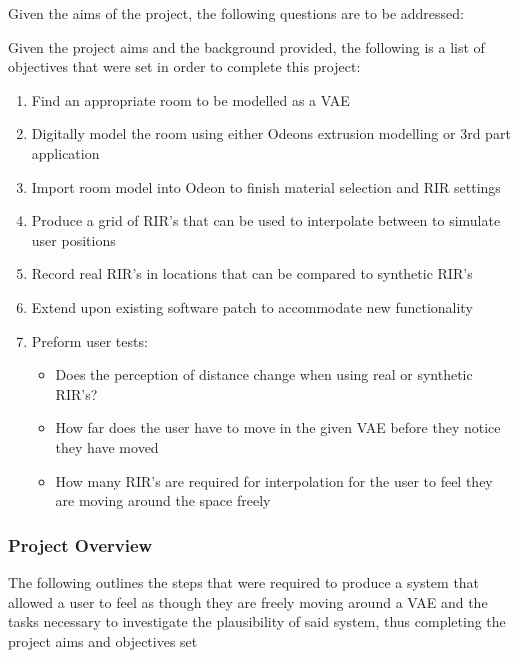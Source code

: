 \documentclass[../../main.tex]{subfiles}
\begin{document}
			Given the aims of the project, the following questions are to be addressed:

			Given the project aims and the background provided, the following is a list of objectives that were set in order to complete this project:

			\begin{enumerate}
				\item Find an appropriate room to be modelled as a \ac{VAE} \\
				\item Digitally model the room using either Odeons extrusion modelling or 3rd part application \\
				\item Import room model into Odeon to finish material selection and \ac{RIR} settings\\
				\item Produce a grid of \ac{RIR}'s that can be used to interpolate between to simulate user positions\\
				\item Record real \ac{RIR}'s in locations that can be compared to synthetic \ac{RIR}'s\\
				\item Extend upon existing software patch to accommodate new functionality\\
				\item  Preform user tests:
					\begin{itemize}
						\item Does the perception of distance change when using real or synthetic \ac{RIR}'s?\\
						\item How far does the user have to move in the given \ac{VAE} before they notice they have moved \\
						\item How many \ac{RIR}'s are required for interpolation for the user to feel they are moving around the space freely\\
					\end{itemize}
				\end{enumerate}


		\subsubsection{Project Overview}

			The following outlines the steps that were required to produce a system that allowed a user to feel as though they are freely moving around a \ac{VAE} and the tasks necessary to investigate the plausibility of said system, thus completing the project aims and objectives set
\end{document}
